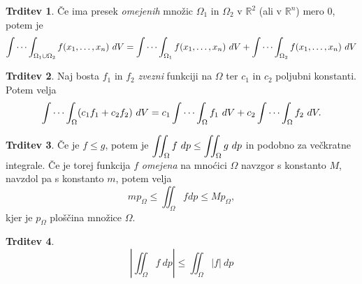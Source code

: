 \documentclass[11pt]{article}
\theoremstyle{definition}
\theoremstyle{definition}
\newtheorem{trditev}{Trditev}[section]
\theoremstyle{definition}
\begin{document}
\begin{trditev}

Če ima presek \textit{omejenih} množic $\Omega_1$ in $\Omega_2$ v $\mathbb{R}^2$ (ali v $\mathbb{R}^n$) mero 0, potem je
$$\idotsint_{\Omega_1 \cup \Omega_2} f(x_1, \ldots, x_n) ~dV = \idotsint_{\Omega_1} f(x_1, \ldots, x_n) ~dV + \idotsint_{\Omega_2} f(x_1, \ldots, x_n) ~dV$$

\end{trditev}
\vspace{0.5cm}

\begin{trditev}

Naj bosta $f_1$ in $f_2$ \textit{zvezni} funkciji na $\Omega$ ter $c_1$ in $c_2$ poljubni konstanti. Potem velja
$$\idotsint_{\Omega} (c_1 f_1 + c_2 f_2) ~dV = c_1 \idotsint_{\Omega} f_1 ~dV + c_2 \idotsint_{\Omega} f_2 ~dV.$$

\end{trditev}
\vspace{0.5cm}

\begin{trditev}

Če je $f \leq g$, potem je $\mathlarger{\iint_\Omega f ~dp \leq \iint_\Omega g ~dp}$ in podobno za večkratne integrale. Če je torej funkcija $f$ \textit{omejena} na mnoćici $\Omega$ navzgor s konstanto $M$, navzdol pa s konstanto $m$, potem velja
$$m p_\Omega \leq \iint_\Omega f dp \leq M p_\Omega,$$
kjer je $p_\Omega$ ploščina množice $\Omega$.

\end{trditev}
\vspace{0.5cm}

\begin{trditev}

$$\left| \iint_\Omega f ~dp \right| \leq \iint_\Omega |f| ~dp$$

\end{trditev}
\vspace{0.5cm}
\end{document}
